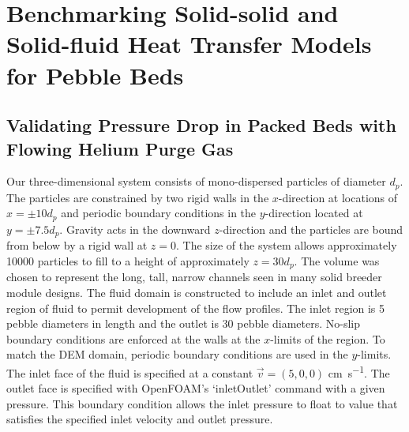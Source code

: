 \FloatBarrier
\section{Benchmarking Solid-solid and Solid-fluid Heat Transfer Models for Pebble Beds}\label{sec:cfd-validate}

\subsection{Validating Pressure Drop in Packed Beds with Flowing Helium Purge Gas}
Our three-dimensional system consists of mono-dispersed particles of diameter $d_p$. The particles are constrained by two rigid walls in the $x$-direction at locations of $x = \pm 10d_p$  and periodic boundary conditions in the $y$-direction located at $y = \pm 7.5d_p$. Gravity acts in the downward $z$-direction and the particles are bound from below by a rigid wall at $z=0$. The size of the system allows approximately \num{10000} particles to fill to a height of approximately $z = 30d_p$. The volume was chosen to represent the long, tall, narrow channels seen in many solid breeder module designs\cite{Cho2008,Poitevin2010,Enoeda2003}. The fluid domain is constructed to include an inlet and outlet region of fluid to permit development of the flow profiles. The inlet region is 5 pebble diameters in length and the outlet is 30 pebble diameters. No-slip boundary conditions are enforced at the walls at the $x$-limits of the region. To match the DEM domain, periodic boundary conditions are used in the $y$-limits. The inlet face of the fluid is specified at a constant $\vec{v} = (5, 0, 0)$ \si{\centi\meter\per\second}. The outlet face is specified with OpenFOAM's `inletOutlet' command with a given pressure. This boundary condition allows the inlet pressure to float to value that satisfies the specified inlet velocity and outlet pressure. %


